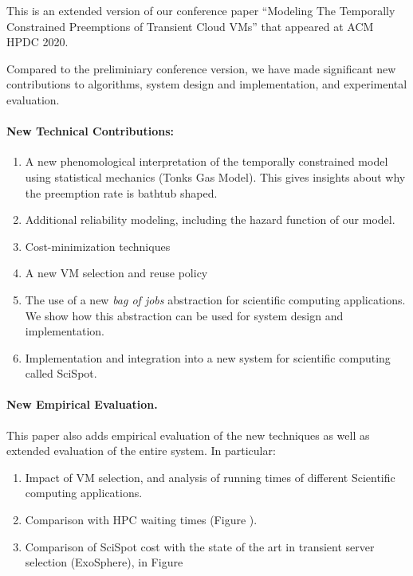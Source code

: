 \documentclass{article}
\begin{document}
This is an extended version of our conference paper ``Modeling The Temporally Constrained Preemptions of Transient Cloud VMs'' that appeared at ACM HPDC 2020. 

Compared to the preliminiary conference version, we have made significant new contributions to algorithms, system design and implementation, and experimental evaluation. 




\paragraph{New Technical Contributions:}

\begin{enumerate}

  
\item A new phenomological interpretation of the temporally constrained model using statistical mechanics (Tonks Gas Model). This gives insights about why the preemption rate is bathtub shaped. 

\item Additional reliability modeling, including the hazard function of our model. 

\item Cost-minimization techniques 

\item A new VM selection and reuse policy 

\item The use of a new \emph{bag of jobs} abstraction for scientific computing applications. We show how this abstraction can be used for system design and implementation.

\item Implementation and integration into a new system for scientific computing called SciSpot. 

\end{enumerate}

\paragraph{New Empirical Evaluation.}
This paper also adds empirical evaluation of the new techniques as well as extended evaluation of the entire system. In particular:

\begin{enumerate}
\item Impact of VM selection, and analysis of running times of different Scientific computing applications. 
\item Comparison with HPC waiting times (Figure ). 
\item Comparison of SciSpot cost with the state of the art in transient server selection (ExoSphere), in Figure 
\end{enumerate}
\end{document}
